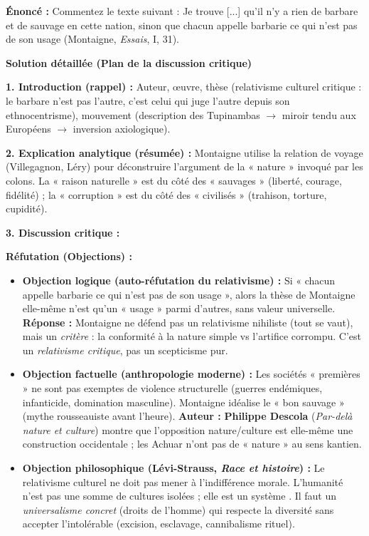 \documentclass[11pt]{article}
\newcounter{popsec}
\newcounter{popsub}
\newcommand{\courssub}[1]{%
  \stepcounter{popsub}%
  \par\vspace{9pt}\noindent{\popxbold\fontsize{11.5}{13}\selectfont\color{popink}{\color{poporange}\thepopsec.\thepopsub}\hspace{6pt}#1}\par\nopagebreak\vspace{4pt}
}
\begin{document}
\courssub{Exercice résolu : Commentaire de texte type Bac}

\begin{exoresolu}
\textbf{Énoncé :} Commentez le texte suivant : \guillemotleft Je trouve [...] qu'il n'y a rien de barbare et de sauvage en cette nation, sinon que chacun appelle barbarie ce qui n'est pas de son usage \guillemotright (Montaigne, \emph{Essais}, I, 31).

\textbf{Solution détaillée (Plan de la discussion critique)}

\textbf{1. Introduction (rappel) :} Auteur, œuvre, thèse (relativisme culturel critique : le barbare n'est pas l'autre, c'est celui qui juge l'autre depuis son ethnocentrisme), mouvement (description des Tupinambas $\rightarrow$ miroir tendu aux Européens $\rightarrow$ inversion axiologique).

\textbf{2. Explication analytique (résumée) :} Montaigne utilise la relation de voyage (Villegagnon, Léry) pour déconstruire l'argument de la « nature » invoqué par les colons. La « raison naturelle » est du côté des « sauvages » (liberté, courage, fidélité) ; la « corruption » est du côté des « civilisés » (trahison, torture, cupidité).

\textbf{3. Discussion critique :}

\textbf{Réfutation (Objections) :}
\begin{itemize}
    \item \textbf{Objection logique (auto-réfutation du relativisme) :} Si « chacun appelle barbarie ce qui n'est pas de son usage », alors la thèse de Montaigne elle-même n'est qu'un « usage » parmi d'autres, sans valeur universelle. \textbf{Réponse :} Montaigne ne défend pas un relativisme nihiliste (tout se vaut), mais un \emph{critère} : la conformité à la nature simple vs l'artifice corrompu. C'est un \emph{relativisme critique}, pas un scepticisme pur.
    \item \textbf{Objection factuelle (anthropologie moderne) :} Les sociétés « premières » ne sont pas exemptes de violence structurelle (guerres endémiques, infanticide, domination masculine). Montaigne idéalise le « bon sauvage » (mythe rousseauiste avant l'heure). \textbf{Auteur :} \textbf{Philippe Descola} (\emph{Par-delà nature et culture}) montre que l'opposition nature/culture est elle-même une construction occidentale ; les Achuar n'ont pas de « nature » au sens kantien.
    \item \textbf{Objection philosophique (Lévi-Strauss, \emph{Race et histoire}) :} Le relativisme culturel ne doit pas mener à l'indifférence morale. \guillemotleft L'humanité n'est pas une somme de cultures isolées ; elle est un système \guillemotright. Il faut un \emph{universalisme concret} (droits de l'homme) qui respecte la diversité sans accepter l'intolérable (excision, esclavage, cannibalisme rituel).
\end{itemize}


\end{exoresolu}
\end{document}
